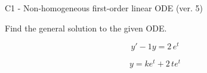 \begin{exercise}
  \begin{exerciseTitle}C1 - Non-homogeneous first-order linear ODE (ver. 5)\end{exerciseTitle}
  \begin{exerciseStatement}
    
Find the general solution to the given ODE.

    
\[y'-1y= 2 \, e^{t}\]

  \end{exerciseStatement}
  \begin{exerciseAnswer}
    
\[y= k e^{t} + 2 \, t e^{t}\]

  \end{exerciseAnswer}
\end{exercise}